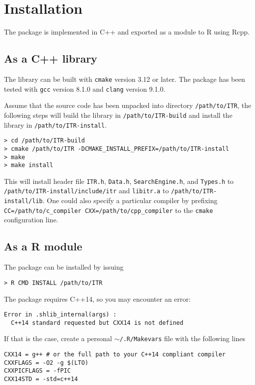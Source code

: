 \chapter{Installation}

The package is implemented in C++ and exported as a module to R using Rcpp.

\section{As a C++ library}

The library can be built with {\tt cmake} version 3.12 or later. The package
has been tested with  {\tt gcc}
version 8.1.0 and {\tt clang} version 9.1.0. 

Assume that the source code has been unpacked into directory
{\tt /path/to/ITR}, the following steps will build the library in
{\tt /path/to/ITR-build} and install the library in
{\tt /path/to/ITR-install}. 

\begin{verbatim}
> cd /path/to/ITR-build
> cmake /path/to/ITR -DCMAKE_INSTALL_PREFIX=/path/to/ITR-install
> make 
> make install
\end{verbatim}

This will install header file {\tt ITR.h}, {\tt Data.h},
{\tt SearchEngine.h}, and {\tt Types.h} to {\tt /path/to/ITR-install/include/itr} and {\tt libitr.a} to {\tt /path/to/ITR-install/lib}. One could also  specify a particular compiler by prefixing
{\tt CC=/path/to/c\_compiler CXX=/path/to/cpp\_compiler} to the
{\tt cmake} configuration line.

\section{As a R module}
The package can be installed by issuing

\begin{verbatim}
> R CMD INSTALL /path/to/ITR
\end{verbatim}

The package requires C++14, so you may encounter an error:

\begin{verbatim}
Error in .shlib_internal(args) : 
  C++14 standard requested but CXX14 is not defined
\end{verbatim}

If that is the case, create a personal {\tt $\sim$/.R/Makevars} file with
the following lines

\begin{verbatim}
CXX14 = g++ # or the full path to your C++14 compliant compiler
CXXFLAGS = -O2 -g $(LTO)
CXXPICFLAGS = -fPIC
CXX14STD = -std=c++14
\end{verbatim}


